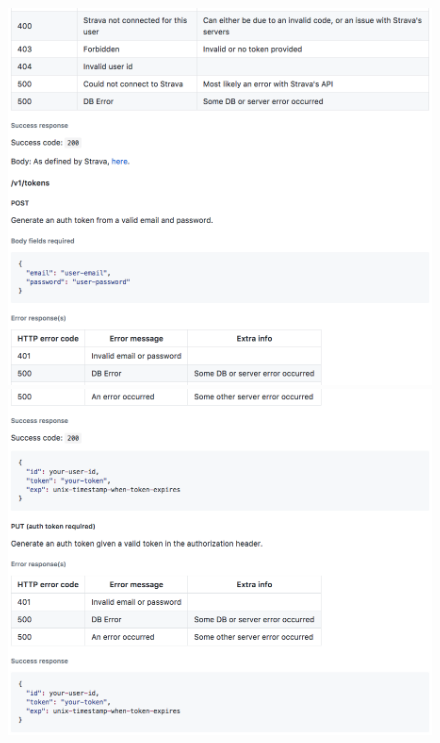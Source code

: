 \documentclass[11pt,openright,a4paper]{report}
\begin{document}
\begin{appendices}
\begin{figure}[ht]
  \centering
  \includegraphics[width=.9\textwidth]{i/apidocs15.png}
  \includegraphics[width=.9\textwidth]{i/apidocs16.png}
\end{figure}

\end{appendices}
\end{document}

